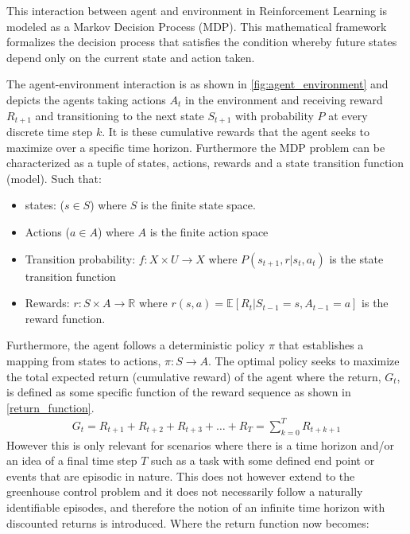 This interaction between agent and environment in Reinforcement Learning is modeled as a Markov Decision Process (MDP). This mathematical framework formalizes the decision process that satisfies the condition whereby future states depend only on the current state and action taken.

The agent-environment interaction is as shown in \autoref{fig:agent_environment} and depicts the agents taking actions $A_t$ in the environment and receiving reward $R_{t+1}$ and transitioning to the next state $S_{t+1}$ with probability $P$ at every discrete time step $k$. It is these cumulative rewards that the agent seeks to maximize over a specific time horizon. Furthermore the MDP problem can be characterized as a tuple of states, actions, rewards and a state transition function (model). Such that:

\begin{itemize}
	\item states: ($s\in S$) where $S$ is the finite state space.
	\item Actions ($a \in A$) where $A$ is the finite action space
	\item Transition probability: $f:X\times U \rightarrow X$ where $P(s_{t+1},r | s_t, a_t)$ is the state transition function
	\item Rewards: $r:S\times A \rightarrow \mathbb{R}$ where $r(s,a) = \mathbb{E}[R_t | S_{t-1} =s, A_{t-1} = a]$  is the reward function.
\end{itemize}


Furthermore, the agent follows a deterministic policy $\pi$ that establishes a mapping from states to actions, $\pi: S \rightarrow A$. The optimal policy seeks to maximize the total expected return (cumulative reward) of the agent where the return, $G_t$, is defined as some specific function of the reward sequence \cite{suttonReinforcementLearningIntroduction2014} as shown in \autoref{return_function}. 
\begin{equation}
	\begin{aligned}
		G_t  = R_{t+1} + R_{t+2} + R_{t+3} + \dots + R_{T} = \sum_{k=0}^TR_{t+k+1}
	\end{aligned}
	\label{return_function}
\end{equation}
However this is only relevant for scenarios where there is a time horizon and/or an idea of a final time step $T$ such as a task with some defined end point or events that are episodic in nature. This does not however extend to the greenhouse control problem and it does not necessarily follow a naturally identifiable episodes, and therefore the notion of an infinite time horizon with discounted returns is introduced. Where the return function now becomes:

